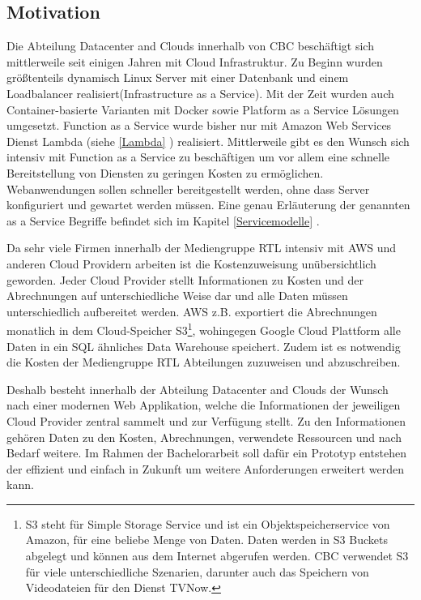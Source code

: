 \subsection{Motivation}
\label{Motivation}
Die Abteilung Datacenter and Clouds innerhalb von CBC beschäftigt sich mittlerweile seit einigen Jahren mit Cloud Infrastruktur.
Zu Beginn wurden größtenteils dynamisch Linux Server mit einer Datenbank und einem Loadbalancer realisiert(Infrastructure as a Service).
Mit der Zeit wurden auch Container-basierte Varianten mit Docker sowie Platform as a Service Lösungen umgesetzt.
Function as a Service wurde bisher nur mit Amazon Web Services Dienst Lambda (siehe \ref{Lambda} ) realisiert.
Mittlerweile gibt es den Wunsch sich intensiv mit Function as a Service zu beschäftigen um vor allem eine schnelle Bereitstellung von Diensten zu geringen Kosten zu ermöglichen.
Webanwendungen sollen schneller bereitgestellt werden, ohne dass Server konfiguriert und gewartet werden müssen.
Eine genau Erläuterung der genannten \glqq [...] as a Service\grqq{} Begriffe befindet sich im Kapitel \ref{Servicemodelle} .

Da sehr viele Firmen innerhalb der Mediengruppe RTL intensiv mit AWS und anderen Cloud Providern arbeiten ist die Kostenzuweisung unübersichtlich geworden.
Jeder Cloud Provider stellt Informationen zu Kosten und der Abrechnungen auf unterschiedliche Weise dar und alle Daten müssen unterschiedlich aufbereitet werden.
AWS z.B. exportiert die Abrechnungen monatlich in dem Cloud-Speicher
S3\footnote{S3 steht für Simple Storage Service und ist ein Objektspeicherservice von Amazon, für eine beliebe Menge von Daten.
Daten werden in S3 Buckets abgelegt und können aus dem Internet abgerufen werden.
CBC verwendet S3 für viele unterschiedliche Szenarien, darunter auch das Speichern von Videodateien für den Dienst TVNow.   }, wohingegen Google Cloud Plattform alle Daten in ein SQL ähnliches Data Warehouse speichert.
Zudem ist es notwendig die Kosten der Mediengruppe RTL Abteilungen zuzuweisen und abzuschreiben.

Deshalb besteht innerhalb der Abteilung Datacenter and Clouds der Wunsch nach einer modernen Web Applikation, welche die Informationen der jeweiligen Cloud Provider zentral sammelt und zur Verfügung stellt.
Zu den Informationen gehören Daten zu den Kosten, Abrechnungen, verwendete Ressourcen und nach Bedarf weitere.
Im Rahmen der Bachelorarbeit soll dafür ein Prototyp entstehen der effizient und einfach in Zukunft um weitere Anforderungen erweitert werden kann.
